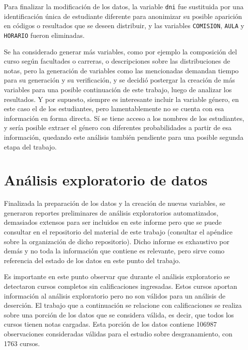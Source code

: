 \documentclass[a4paper,11pt,dvipsnames]{article}
\begin{document}
Para finalizar la modificación de los datos, la variable \texttt{dni} fue sustituida por una identificación única de estudiante diferente para anonimizar su posible aparición en códigos o resultados que se deseen distribuir, y las variables \texttt{COMISION}, \texttt{AULA} y \texttt{HORARIO} fueron eliminadas.\par\medskip

Se ha considerado generar más variables, como por ejemplo la composición del curso según facultades o carreras, o descripciones sobre las distribuciones de notas, pero la generación de variables como las mencionadas demandan tiempo para su generación y su verificación, y se decidió postergar la creación de más variables para una posible continuación de este trabajo, luego de analizar los resultados. Y por supuesto, siempre es interesante incluir la variable género, en este caso el de los estudiantes, pero lamentablemente no se cuenta con esa información en forma directa. Sí se tiene acceso a los nombres de los estudiantes, y sería posible extraer el género con diferentes probabilidades a partir de esa información, quedando este análisis también pendiente para una posible segunda etapa del trabajo.


\section{Análisis exploratorio de datos}

Finalizada la preparación de los datos y la creación de nuevas variables, se generaron reportes preliminares de análisis exploratorios automatizados, demasiados extensos para ser incluidos en este informe pero que se puede consultar en el repositorio del material de este trabajo (consultar el apéndice sobre la organización de dicho repositorio). Dicho informe es exhaustivo por demás y no toda la información que contiene es relevante, pero sirve como referencia del estado de los datos en este punto del trabajo.\par\medskip

Es importante en este punto observar que durante el análisis exploratorio se detectaron cursos completos sin calificaciones ingresadas. Estos cursos aportan información al análisis exploratorio pero no son válidos para un análisis de deserción. El trabajo que a continuación se relacione con calificaciones se realiza sobre una porción de los datos que se considera válida, es decir, que todos los cursos tienen notas cargadas. Esta porción de los datos contiene 106987 observaciones consideradas válidas para el estudio sobre desgranamiento, con 1763 cursos.\par\medskip
\end{document}
